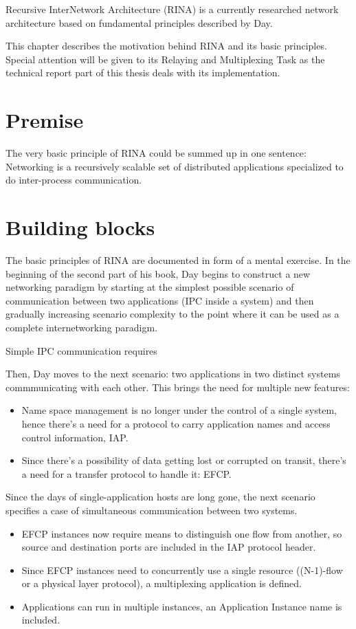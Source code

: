     Recursive InterNetwork Architecture (RINA) is a currently researched network architecture based on fundamental principles described by Day.

    This chapter describes the motivation behind RINA and its basic principles. Special attention will be given to its Relaying and Multiplexing Task as the technical report part of this thesis deals with its implementation.

    \section{Premise}
        The very basic principle of RINA could be summed up in one sentence: Networking is a recursively scalable set of distributed applications specialized to do inter-process communication.

    \section{Building blocks}
        The basic principles of RINA are documented in form of a mental exercise. In the beginning of the second part of his book, Day begins to construct a new networking paradigm by starting at the simplest possible scenario of communication between two applications (IPC inside a system) and then gradually increasing scenario complexity to the point where it can be used as a complete internetworking paradigm.

        Simple IPC communication requires

        Then, Day moves to the next scenario: two applications in two distinct systems commmunicating with each other. This brings the need for multiple new features:

        \begin{itemize}
        \item Name space management is no longer under the control of a single system, hence there's a need for a protocol to carry application names and access control information, IAP.
        \item Since there's a possibility of data getting lost or corrupted on transit, there's a need for a transfer protocol to handle it: EFCP.
        \end{itemize}

        Since the days of single-application hosts are long gone, the next scenario specifies a case of simultaneous communication between two systems.

        \begin{itemize}
        \item EFCP instances now require means to distinguish one flow from another, so source and destination ports are included in the IAP protocol header.
        \item Since EFCP instances need to concurrently use a single resource ((N-1)-flow or a physical layer protocol), a multiplexing application is defined.
        \item Applications can run in multiple instances, an Application Instance name is included.
        \end{itemize}

